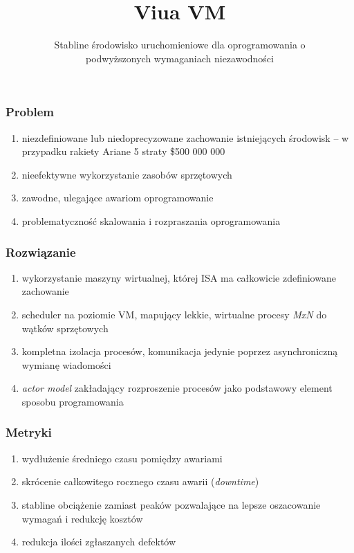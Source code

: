 \documentclass[aspectratio=169]{beamer}
\title{Viua VM}
\subtitle{Stabline środowisko uruchomieniowe dla oprogramowania o\\podwyższonych wymaganiach niezawodności}
\begin{document}

\frame{\titlepage}

\begin{frame}
    \frametitle{Problem}

    \begin{enumerate}
        \item niezdefiniowane lub niedoprecyzowane zachowanie istniejących
            środowisk -- w przypadku rakiety Ariane 5 straty \$500 000 000
        \item nieefektywne wykorzystanie zasobów sprzętowych
        \item zawodne, ulegające awariom oprogramowanie
        \item problematyczność skalowania i rozpraszania oprogramowania
    \end{enumerate}
\end{frame}

\begin{frame}
    \frametitle{Rozwiązanie}

    \begin{enumerate}
        \item wykorzystanie maszyny wirtualnej, której ISA ma całkowicie
            zdefiniowane zachowanie
        \item scheduler na poziomie VM, mapujący lekkie, wirtualne procesy
            \emph{MxN} do wątków sprzętowych
        \item kompletna izolacja procesów, komunikacja jedynie poprzez
            asynchroniczną wymianę wiadomości
        \item \emph{actor model} zakładający rozproszenie procesów jako
            podstawowy element sposobu programowania
    \end{enumerate}
\end{frame}

\begin{frame}
    \frametitle{Metryki}

    \begin{enumerate}
        \item wydłużenie średniego czasu pomiędzy awariami
        \item skrócenie całkowitego rocznego czasu awarii (\emph{downtime})
        \item stabline obciążenie zamiast peaków pozwalające na lepsze
            oszacowanie wymagań i redukcję kosztów
        \item redukcja ilości zgłaszanych defektów
    \end{enumerate}
\end{frame}
\end{document}
